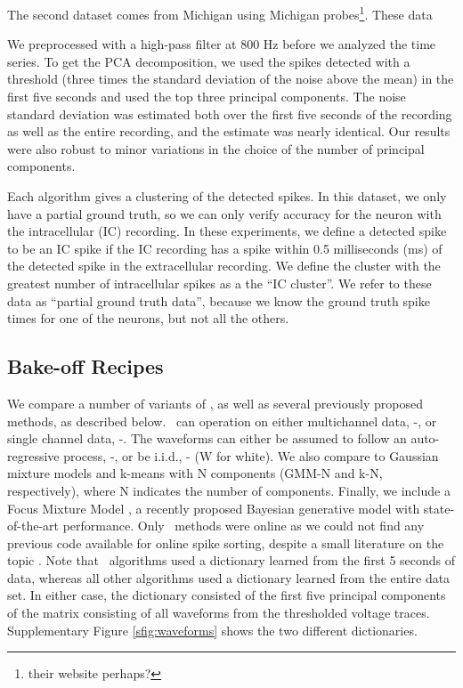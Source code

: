 The second dataset comes from Michigan using Michigan probes\footnote{their website perhaps?}.  These data 



We preprocessed with a high-pass filter at 800 Hz before we analyzed the time series.  To get the PCA decomposition, we used the spikes detected with a threshold (three times the standard deviation of the noise above the mean) in the first five seconds and used the top three principal components.  The noise standard deviation was estimated both over the first five seconds of the recording as well as the entire recording, and the estimate was nearly identical.  Our results were also robust to minor variations in the choice of the number of principal components.

Each algorithm gives a clustering of the detected spikes.  In this dataset, we only have a partial ground truth, so we can only verify accuracy for the neuron with the intracellular (IC) recording.  In these experiments, we define a detected spike to be an IC spike if the IC recording has a spike within 0.5 milliseconds (ms) of the detected spike in the extracellular recording.  We define the cluster with the greatest number of intracellular spikes as a the ``IC cluster''.   We refer to these data as ``partial ground truth data'', because we know the ground truth spike times for one of the neurons, but not all the others.  




\subsection{Bake-off Recipes}

We compare a number of variants of \smug, as well as several previously proposed methods, as described below.  \smug~can operation on either multichannel data, \smug-, or single channel data, \smug-.  The waveforms can either be assumed to follow an auto-regressive process, \smug-, or be i.i.d., \smug- (W for white).   We also compare to Gaussian mixture models and k-means with N components (GMM-N and k-N, respectively), where N indicates the number of components.  Finally, we include a Focus Mixture Model \cite{??}, a recently proposed Bayesian generative model with state-of-the-art performance.  Only \smug~methods were online as we could not find any previous code available for online spike sorting, despite a small literature on the topic \cite{??}.  Note that \smug~algorithms used a dictionary learned from the first 5 seconds of data, whereas all other algorithms used a dictionary learned from the entire data set.  In either case, the dictionary consisted of the first five principal components of the matrix consisting of all waveforms from the thresholded voltage traces.  Supplementary Figure \ref{sfig:waveforms} shows the two different dictionaries.

